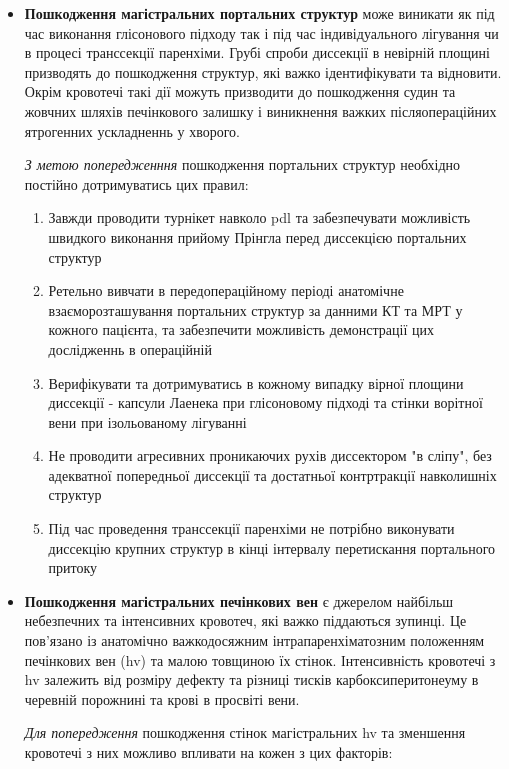 \begin{refsection}
\begin{itemize}
    \item \textbf{Пошкодження магістральних портальних структур} може виникати як під час виконання глісонового підходу так і під час індивідуального лігування чи в процесі транссекції паренхіми. Грубі спроби диссекції в невірній площині призводять до пошкодження структур, які важко ідентифікувати та відновити. Окрім кровотечі такі дії можуть призводити до пошкодження судин та жовчних шляхів печінкового залишку і виникнення важких післяопераційних ятрогенних ускладненнь у хворого. 
    
    \textit{З метою попередженння} пошкодження портальних структур необхідно постійно дотримуватись цих правил:
    \begin{enumerate}
        \item Завжди проводити турнікет навколо \acrshort{pdl} та забезпечувати можливість швидкого виконання прийому Прінгла перед диссекцією портальних структур 
        \item Ретельно вивчати в передопераційному періоді анатомічне взаєморозташування портальних структур за данними КТ та МРТ у кожного пацієнта, та забезпечити можливість демонстрації цих дослідженнь в операційній
        \item Верифікувати та дотримуватись в кожному випадку вірної площини диссекції - капсули Лаенека при глісоновому підході та стінки ворітної вени при ізольованому лігуванні
        \item Не проводити агресивних проникаючих рухів диссектором "в сліпу", без адекватної попередньої диссекції та достатньої контртракції навколишніх структур
        \item Під час проведення транссекції паренхіми не потрібно виконувати диссекцію крупних структур в кінці інтервалу перетискання портального притоку 
    \end{enumerate}
    
    \item \textbf{Пошкодження магістральних печінкових вен} є джерелом найбільш небезпечних та інтенсивних кровотеч, які важко піддаються зупинці. Це пов'язано із анатомічно важкодосяжним інтрапаренхіматозним положенням печінкових вен (\acrshort{hv}) та малою товщиною їх стінок. Інтенсивність кровотечі з \acrshort{hv} залежить від розміру дефекту та різниці тисків карбоксиперитонеуму в черевній порожнині та крові в просвіті вени. 
    
    \textit{Для попередження} пошкодження стінок магістральних \acrshort{hv} та зменшення кровотечі з них можливо впливати на кожен з цих факторів:
    

\end{itemize}
\end{refsection}
